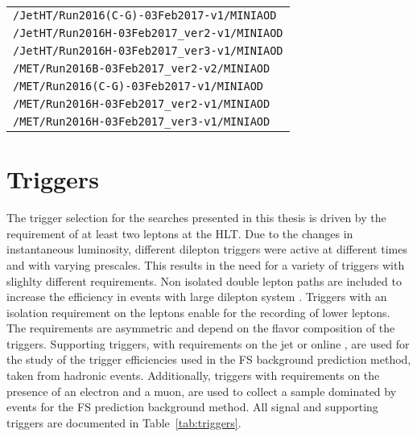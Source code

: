 \begin{table}[ht!]
\begin{center}
\begin{tabular}{ l}
        \texttt{/JetHT/Run2016(C-G)-03Feb2017-v1/MINIAOD}   \\
        \texttt{/JetHT/Run2016H-03Feb2017\_ver2-v1/MINIAOD}    \\
        \texttt{/JetHT/Run2016H-03Feb2017\_ver3-v1/MINIAOD}   \\     
        \texttt{/MET/Run2016B-03Feb2017\_ver2-v2/MINIAOD}   \\
        \texttt{/MET/Run2016(C-G)-03Feb2017-v1/MINIAOD}   \\
        \texttt{/MET/Run2016H-03Feb2017\_ver2-v1/MINIAOD}    \\
        \texttt{/MET/Run2016H-03Feb2017\_ver3-v1/MINIAOD}   \\     
        \hline
\hline\hline
\end{tabular}
\end{center}
\end{table}                                                                                  

\section{Triggers}
The trigger selection for the searches presented in this thesis is driven by the requirement of at least two leptons at the HLT.
Due to the changes in instantaneous luminosity, different dilepton triggers were active at different times and with varying prescales. 
This results in the need for a variety of triggers with slighlty different requirements.
Non isolated double lepton paths are included to increase the efficiency in events with large dilepton system \pt. 
Triggers with an isolation requirement on the leptons enable for the recording of lower \pt leptons. 
The \pt requirements are asymmetric and depend on the flavor composition of the triggers.
Supporting triggers, with requirements on the jet \HT or online \ptmiss, are used for the study of the trigger efficiencies used in the FS background prediction method, taken from hadronic events. 
Additionally, triggers with requirements on the presence of an electron and a muon, are used to collect a sample dominated by \ttbar events for the FS prediction background method.
All signal and supporting triggers are documented in Table~\ref{tab:triggers}.                                                                                                        

